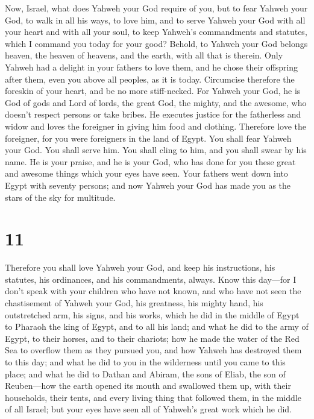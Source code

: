  Now, Israel, what does Yahweh your God require of you,
but to fear Yahweh your God, to walk in all his ways, to love him, and
to serve Yahweh your God with all your heart and with all your soul,
 to keep Yahweh's commandments and statutes, which I
command you today for your good?  Behold, to Yahweh your
God belongs heaven, the heaven of heavens, and the earth, with all that
is therein.  Only Yahweh had a delight in your fathers to
love them, and he chose their offspring after them, even you above all
peoples, as it is today.  Circumcise therefore the
foreskin of your heart, and be no more stiff-necked.  For
Yahweh your God, he is God of gods and Lord of lords, the great God, the
mighty, and the awesome, who doesn't respect persons or take bribes.
 He executes justice for the fatherless and widow and
loves the foreigner in giving him food and clothing. 
Therefore love the foreigner, for you were foreigners in the land of
Egypt.  You shall fear Yahweh your God. You shall serve
him. You shall cling to him, and you shall swear by his name.
 He is your praise, and he is your God, who has done for
you these great and awesome things which your eyes have seen.
 Your fathers went down into Egypt with seventy persons;
and now Yahweh your God has made you as the stars of the sky for
multitude.

\hypertarget{section-10}{%
\section{11}\label{section-10}}

 Therefore you shall love Yahweh your God, and keep his
instructions, his statutes, his ordinances, and his commandments,
always.  Know this day---for I don't speak with your
children who have not known, and who have not seen the chastisement of
Yahweh your God, his greatness, his mighty hand, his outstretched arm,
 his signs, and his works, which he did in the middle of
Egypt to Pharaoh the king of Egypt, and to all his land; 
and what he did to the army of Egypt, to their horses, and to their
chariots; how he made the water of the Red Sea to overflow them as they
pursued you, and how Yahweh has destroyed them to this day;
 and what he did to you in the wilderness until you came
to this place;  and what he did to Dathan and Abiram, the
sons of Eliab, the son of Reuben---how the earth opened its mouth and
swallowed them up, with their households, their tents, and every living
thing that followed them, in the middle of all Israel; 
but your eyes have seen all of Yahweh's great work which he did.


